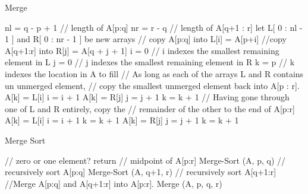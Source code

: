 \begin{algorithm}[H]\alglr
  \caption{Merge} 
  \begin{algorithmic}[1]
       \State nl = q - p + 1 // length of A[p:q]
    \State nr = r - q // length of A[q+1 : r]
    \State let L[ 0 : nl - 1 ] and R[ 0 : nr - 1 ] be new arrays
     // copy A[p:q] into 
      \State L[i] = A[p+i]
    \EndFor
     //copy A[q+1:r] into  
      \State R[j] = A[q + j + 1]
      \State i = 0 // i indexes the smallest remaining element in L
      \State j = 0 // j indexes the smallest remaining element in R
      \State k = p // k indexes the location in A to fill
     \EndFor
    // As long as each of the arrays L and R contains un unmerged element,
    // copy the smallest unmerged element back into A[p : r].
              \State A[k] = L[i]
              \State i = i + 1
          \Else A[k] = R[j]
              \State j = j + 1
              \State k = k + 1
           \EndIf
      \EndWhile
    // Having gone through one of L and R entirely, copy the
    //      remainder of the other to the end of A[p:r]
             \State A[k] = L[i]
             \State i = i + 1
             \State k = k + 1
     \EndWhile      
            \State A[k] = R[j]
            \State j = j + 1
            \State k = k + 1 
      \EndWhile
  \end{algorithmic}
  \label{alg:merge}
\end{algorithm}

\begin{algorithm}[H]\alglr
  \caption{Merge Sort} 
  \begin{algorithmic}[1]
    \If {}	// zero or one element?
    	return
    \State {}	// midpoint of A[p:r]
    Merge-Sort (A, p, q)	// recursively sort A[p:q]
    Merge-Sort (A, q+1, r)	// recursively sort A[q+1:r]
    //Merge A[p:q] and A[q+1:r] into A[p:r].
    Merge (A, p, q, r)
    \EndIf
  \end{algorithmic}
  \label{alg:merge-sort}
\end{algorithm}
